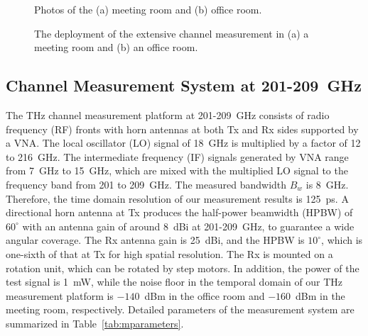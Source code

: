 \documentclass[journal,12pt,draftclsnofoot,onecolumn]{IEEEtran}
\begin{document}
\begin{figure}[thbp]
\centering
\caption{Photos of the (a) meeting room and (b) office room.}
\label{fig:photo}
\end{figure}
\begin{figure*}[thbp]
\centering
    \label{fig:deployment_meeting}
    
\caption{The deployment of the extensive channel measurement in (a) a meeting room and (b) an office room.}
\label{fig:deployment}
\end{figure*}

\subsection{Channel Measurement System at 201-209~GHz}
\par The THz channel measurement platform at 201-209~GHz consists of radio frequency (RF) fronts with horn antennas at both Tx and Rx sides supported by a VNA. The local oscillator (LO) signal of 18~GHz is multiplied by a factor of 12 to 216~GHz. The intermediate frequency (IF) signals generated by VNA range from 7~GHz to 15~GHz, which are mixed with the multiplied LO signal to the frequency band from 201 to 209~GHz. The measured bandwidth $B_w$ is 8~GHz. Therefore, the time domain resolution of our measurement results is 125~ps. A directional horn antenna at Tx produces the half-power beamwidth (HPBW) of $60^\circ$ with an antenna gain of around 8~dBi at 201-209~GHz, to guarantee a wide angular coverage. The Rx antenna gain is 25~dBi, and the HPBW is $10^\circ$, which is one-sixth of that at Tx for high spatial resolution. The Rx is mounted on a rotation unit, which can be rotated by step motors. In addition, the power of the test signal is 1~mW, while the noise floor in the temporal domain of our THz measurement platform is $-140$~dBm in the office room and $-160$~dBm in the meeting room, respectively. Detailed parameters of the measurement system are summarized in Table~\ref{tab:mparameters}. 
\end{document}
